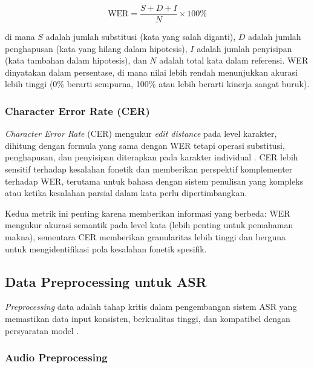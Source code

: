 \vspace{1cm}
\begin{equation}
\label{eq:wer}
\text{WER} = \frac{S + D + I}{N} \times 100\%
\end{equation}
\vspace{1cm}

di mana $S$ adalah jumlah substitusi (kata yang salah diganti), $D$ adalah jumlah penghapusan (kata yang hilang dalam hipotesis), $I$ adalah jumlah penyisipan (kata tambahan dalam hipotesis), dan $N$ adalah total kata dalam referensi. WER dinyatakan dalam persentase, di mana nilai lebih rendah menunjukkan akurasi lebih tinggi (0\% berarti sempurna, 100\% atau lebih berarti kinerja sangat buruk).

\subsubsection{Character Error Rate (CER)}

\textit{Character Error Rate} (CER) mengukur \textit{edit distance} pada level karakter, dihitung dengan formula yang sama dengan WER tetapi operasi substitusi, penghapusan, dan penyisipan diterapkan pada karakter individual \cite{morris2004wer}. CER lebih sensitif terhadap kesalahan fonetik dan memberikan perspektif komplementer terhadap WER, terutama untuk bahasa dengan sistem penulisan yang kompleks atau ketika kesalahan parsial dalam kata perlu dipertimbangkan.

Kedua metrik ini penting karena memberikan informasi yang berbeda: WER mengukur akurasi semantik pada level kata (lebih penting untuk pemahaman makna), sementara CER memberikan granularitas lebih tinggi dan berguna untuk mengidentifikasi pola kesalahan fonetik spesifik.

\subsection{Data Preprocessing untuk ASR}
\label{II.Preprocessing}

\textit{Preprocessing} data adalah tahap kritis dalam pengembangan sistem ASR yang memastikan data input konsisten, berkualitas tinggi, dan kompatibel dengan persyaratan model \cite{park2019specaugment,radford2023whisper}.

\subsubsection{Audio Preprocessing}

